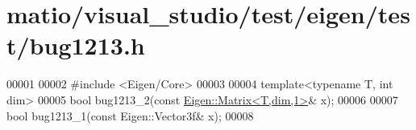 \hypertarget{matio_2visual__studio_2test_2eigen_2test_2bug1213_8h_source}{}\section{matio/visual\+\_\+studio/test/eigen/test/bug1213.h}
\label{matio_2visual__studio_2test_2eigen_2test_2bug1213_8h_source}

\begin{DoxyCode}
00001 
00002 \textcolor{preprocessor}{#include <Eigen/Core>}
00003 
00004 \textcolor{keyword}{template}<\textcolor{keyword}{typename} T, \textcolor{keywordtype}{int} dim>
00005 \textcolor{keywordtype}{bool} bug1213\_2(\textcolor{keyword}{const} \hyperlink{group___core___module_class_eigen_1_1_matrix}{Eigen::Matrix<T,dim,1>}& x);
00006 
00007 \textcolor{keywordtype}{bool} bug1213\_1(\textcolor{keyword}{const} Eigen::Vector3f& x);
00008 
\end{DoxyCode}
